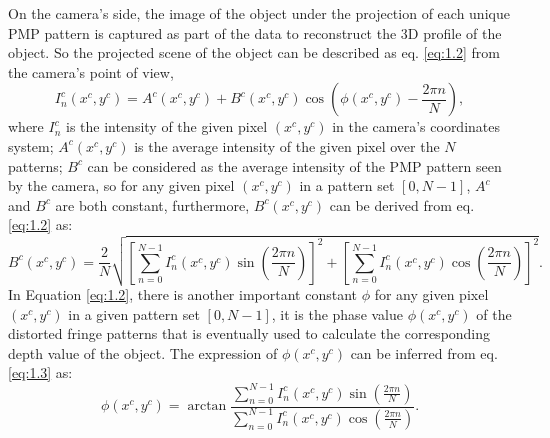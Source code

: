 \documentclass[]{spie}  %
\begin{document}
On the camera's side, the image of  the object under the projection of each unique PMP pattern is captured as part of the data to reconstruct the 3D profile of the object. So the projected scene of the object can be described as eq. \eqref{eq:1.2} from the camera's point of view, 
 \begin{equation} \label{eq:1.2}
  	I^c_n(x^c, y^c) =  A^c(x^c, y^c) + B^c(x^c, y^c)\cos(\phi(x^c, y^c) - \frac{2\pi n}{N}),
  \end{equation}
where $I^c_n$ is the intensity of the given pixel $(x^c, y^c)$ in the camera's coordinates system; $A^c(x^c, y^c)$ is the average intensity of the given pixel over the $N$ patterns; $B^c$ can be considered as the average intensity of the PMP pattern seen by the camera, so for any given pixel $(x^c, y^c)$ in a pattern set $[0, N-1]$, $A^c$ and $B^c$ are both constant, furthermore, $B^c(x^c, y^c)$ can be derived from eq. \eqref{eq:1.2} as:
  \begin{equation} \label{eq:1.3}
  	B^c(x^c, y^c) = \frac{2}{N}\sqrt{\left[\sum_{n=0}^{N-1}I_n^c(x^c, y^c)\sin (\frac{2\pi n}{N})\right]^2 + \left[\sum_{n=0}^{N-1}I_n^c(x^c, y^c)\cos (\frac{2\pi n}{N})\right]^2}.
  \end{equation}
In Equation \ref{eq:1.2}, there is another important constant $\phi$ for any given pixel $(x^c, y^c)$ in a given pattern set $[0, N-1]$, it is the phase value $\phi (x^c, y^c)$ of the distorted fringe patterns that is eventually used to calculate the corresponding depth value of the object. The expression of $\phi (x^c, y^c)$ can be inferred from eq. \eqref{eq:1.3} as:
  \begin{equation} \label{eq:1.4}
  	\phi (x^c, y^c) = \arctan \frac{\sum_{n=0}^{N-1} I^c_n(x^c, y^c)\sin(\frac{2\pi n}{N})}{\sum_{n=0}^{N-1} I^c_n(x^c, y^c)\cos(\frac{2\pi n}{N})}.
  \end{equation}
\end{document}
